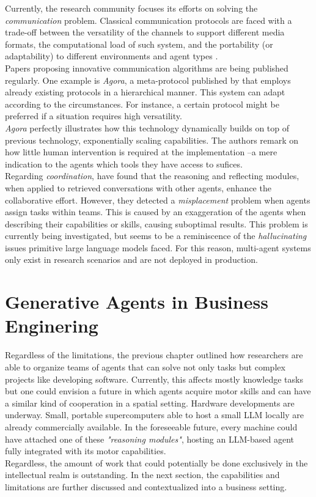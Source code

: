 Currently, the research community focuses its efforts on solving the \textit{communication} problem. Classical communication protocols are faced with a trade-off between the versatility of the channels to support different media formats, the computational load of such system, and the portability (or adaptability) to different environments and agent types \parencite[p. 3]{marro_scalable_2024}. \\
Papers proposing innovative communication algorithms are being published regularly. One example is \textit{Agora}, a meta-protocol published by \textcite[pp. 5-6]{marro_scalable_2024} that employs already existing protocols in a hierarchical manner. This system can adapt according to the circumstances. For instance, a certain protocol might be preferred if a situation requires high versatility. \\
\textit{Agora} perfectly illustrates how this technology dynamically builds on top of previous technology, exponentially scaling capabilities. The authors remark on how little human intervention is required at the implementation --a mere indication to the agents which tools they have access to sufices.\\
Regarding \textit{coordination}, \textcite[pp. 16-17]{li_metaagents_2023} have found that the reasoning and reflecting modules, when applied to retrieved conversations with other agents, enhance the collaborative effort. However, they detected a \textit{misplacement} problem when agents assign tasks within teams. This is caused by an exaggeration of the agents when describing their capabilities or skills, causing suboptimal results. This problem is currently being investigated, but seems to be a reminiscence of the \textit{hallucinating} issues primitive large language models faced. For this reason, multi-agent systems only exist in research scenarios and are not deployed in production.
\section{Generative Agents in Business Enginering}
Regardless of the limitations, the previous chapter outlined how researchers are able to organize teams of agents that can solve not only tasks but complex projects like developing software. Currently, this affects mostly knowledge tasks but one could envision a future in which agents acquire motor skills and can have a similar kind of cooperation in a spatial setting. Hardware developments are underway. Small, portable supercomputers able to host a small LLM locally are already commercially available. In the foreseeable future, every machine could have attached one of these \textit{"reasoning modules"}, hosting an LLM-based agent fully integrated with its motor capabilities. \\
Regardless, the amount of work that could potentially be done exclusively in the intellectual realm is outstanding. In the next section, the capabilities and limitations are further discussed and contextualized into a business setting.
